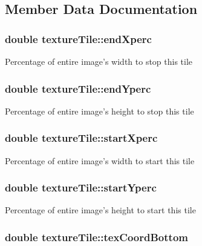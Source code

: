 \subsection{Member Data Documentation}
\hypertarget{structtexture_tile_aebe32c7e9b5ef7c4b309c744c99469a9}{
\subsubsection[{endXperc}]{\setlength{\rightskip}{0pt plus 5cm}double {\bf textureTile::endXperc}}}
\label{structtexture_tile_aebe32c7e9b5ef7c4b309c744c99469a9}
Percentage of entire image's width to stop this tile \hypertarget{structtexture_tile_af57335249bbbac5818bb94a0371463fd}{
\subsubsection[{endYperc}]{\setlength{\rightskip}{0pt plus 5cm}double {\bf textureTile::endYperc}}}
\label{structtexture_tile_af57335249bbbac5818bb94a0371463fd}
Percentage of entire image's height to stop this tile \hypertarget{structtexture_tile_a988262225d6d9871c0fb4d9068a472ce}{
\subsubsection[{startXperc}]{\setlength{\rightskip}{0pt plus 5cm}double {\bf textureTile::startXperc}}}
\label{structtexture_tile_a988262225d6d9871c0fb4d9068a472ce}
Percentage of entire image's width to start this tile \hypertarget{structtexture_tile_ab7429d2be77dbe8785c4e7d3a281961a}{
\subsubsection[{startYperc}]{\setlength{\rightskip}{0pt plus 5cm}double {\bf textureTile::startYperc}}}
\label{structtexture_tile_ab7429d2be77dbe8785c4e7d3a281961a}
Percentage of entire image's height to start this tile \hypertarget{structtexture_tile_ab666fa6d9772547b6108181629b0bcc3}{
\subsubsection[{texCoordBottom}]{\setlength{\rightskip}{0pt plus 5cm}double {\bf textureTile::texCoordBottom}}}
